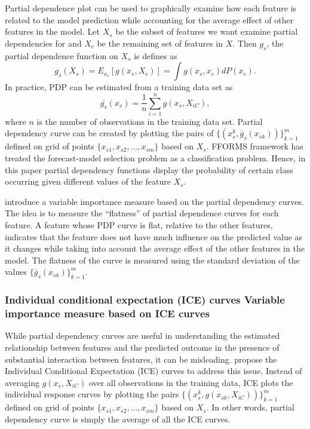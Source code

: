 \documentclass[11pt,a4paper,]{article}
\begin{document}
Partial dependence plot can be used to graphically examine how each
feature is related to the model prediction while accounting for the
average effect of other features in the model. Let \(X_s\) be the subset
of features we want examine partial dependencies for and \(X_c\) be the
remaining set of features in \(X\). Then \(g_s\), the partial dependence
function on \(X_s\) is defines as
\[g_s(X_s)=E_{x_c}[g(x_s, X_c)]=\int{g(x_s, x_c)dP(x_c).}\] In practice,
PDP can be estimated from a training data set as
\[\bar{g_s}(x_s)=\frac{1}{n}\sum_{i=1}^{n}g(x_s, X_{iC}),\] where \(n\)
is the number of observations in the training data set. Partial
dependency curve can be created by plotting the pairs of
\(\{(x_s^k, \bar{g}_s(x_{sk}))\}_{k=1}^{m}\) defined on grid of points
\(\{x_{s1}, x_{s2},\dots, x_{sm}\}\) based on \(X_s\). FFORMS framework
has treated the forecast-model selection problem as a classification
problem. Hence, in this paper partial dependency functions display the
probability of certain class occurring given different values of the
feature \(X_s\).

\textcite{Greenwell2018} introduce a variable importance measure based
on the partial dependency curves. The idea is to measure the
``flatness'' of partial dependence curves for each feature. A feature
whose PDP curve is flat, relative to the other features, indicates that
the feature does not have much influence on the predicted value as it
changes while taking into account the average effect of the other
features in the model. The flatness of the curve is measured using the
standard deviation of the values \(\{\bar{g}_{s}(x_{sk})\}_{k=1}^{m}\).

\subsubsection{Individual conditional expectation (ICE) curves Variable
importance measure based on ICE
curves}\label{individual-conditional-expectation-ice-curves-variable-importance-measure-based-on-ice-curves}

While partial dependency curves are useful in understanding the
estimated relationship between features and the predicted outcome in the
presence of substantial interaction between features, it can be
misleading. \textcite{goldstein2015peeking} propose the Individual
Conditional Expectation (ICE) curves to address this issue. Instead of
averaging \(g(x_s, X_{iC})\) over all observations in the training data,
ICE plots the individual response curves by plotting the pairs
\(\{(x_s^k, g(x_{sk}, X_{iC}))\}_{k=1}^{m}\) defined on grid of points
\(\{x_{s1}, x_{s2},\dots, x_{sm}\}\) based on \(X_s\). In other words,
partial dependency curve is simply the average of all the ICE curves.
\end{document}

